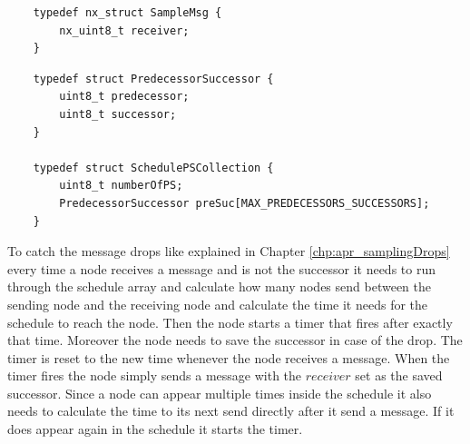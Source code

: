 \begin{lstlisting}
	typedef nx_struct SampleMsg {
		nx_uint8_t receiver;
	}
\end{lstlisting} 

\begin{lstlisting}
	typedef struct PredecessorSuccessor {
		uint8_t predecessor;
		uint8_t successor;
	}

	typedef struct SchedulePSCollection {
		uint8_t numberOfPS;
		PredecessorSuccessor preSuc[MAX_PREDECESSORS_SUCCESSORS]; 
	}
\end{lstlisting}

To catch the message drops like explained in Chapter \ref{chp:apr_samplingDrops} every time a node receives a message and is not the successor it needs to run through the schedule array and calculate how many nodes send between the sending node and the receiving node and calculate the time it needs for the schedule to reach the node. Then the node starts a timer that fires after exactly that time. Moreover the node needs to save the successor in case of the drop. The timer is reset to the new time whenever the node receives a message. When the timer fires the node simply sends a message with the $receiver$ set as the saved successor. Since a node can appear multiple times inside the schedule it also needs to calculate the time to its next send directly after it send a message. If it does appear again in the schedule it starts the timer.  